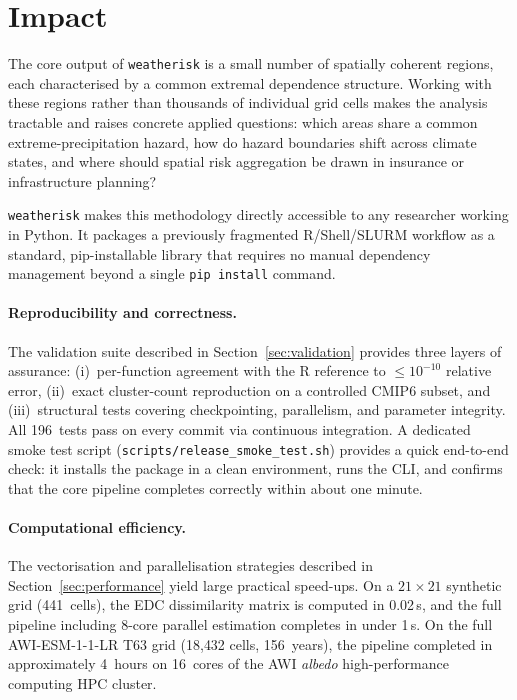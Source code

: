 \documentclass[preprint,12pt,a4paper]{elsarticle}
\newcommand{\rev}[1]{{#1}}
\newcommand{\revg}[1]{{#1}}
\newcommand{\revo}[1]{{#1}}
\begin{document}
\FloatBarrier

\section{Impact}
\label{sec:impact}

\revg{The core output of \texttt{weatherisk} is a small number of
spatially coherent regions, each characterised by a common extremal
dependence structure. Working with these regions rather than
thousands of individual grid cells makes the analysis tractable and
raises concrete applied questions: which areas share a common
extreme-precipitation hazard, how do hazard boundaries shift across
climate states, and where should spatial risk aggregation be drawn
in insurance or infrastructure planning?}

\revo{\texttt{weatherisk} makes this methodology directly accessible
to any researcher working in Python. It packages a previously
fragmented R/Shell/SLURM workflow as a standard, pip-installable
library that requires no manual dependency management beyond a single
\texttt{pip install} command.}

\rev{\paragraph{Reproducibility and correctness.}
The validation suite described in Section~\ref{sec:validation}
provides three layers of assurance: (i)~per-function agreement
with the R reference to $\leq 10^{-10}$ relative error, (ii)~exact
cluster-count reproduction on a controlled CMIP6 subset, and
(iii)~structural tests covering checkpointing, parallelism, and
parameter integrity. All 196~tests pass on every commit via
continuous integration.
A dedicated smoke test script (\texttt{scripts/release\_smoke\_test.sh})
provides a quick end-to-end check: it installs the package in a clean
environment, runs the CLI, and confirms that the core pipeline completes
correctly within about one minute.}

\paragraph{Computational efficiency.}
The vectorisation and parallelisation strategies described in
Section~\ref{sec:performance} yield large practical speed-ups.
On a $21 \times 21$ synthetic grid (441~cells), the EDC
dissimilarity matrix is computed in 0.02\,s, and the full pipeline
including 8-core parallel estimation completes in under 1\,s.
\rev{On the full AWI-ESM-1-1-LR T63 grid (18{,}432 cells,
156~years), the pipeline completed in approximately 4~hours
on 16~cores of the AWI \emph{albedo} high-performance computing
HPC cluster.}
\end{document}
